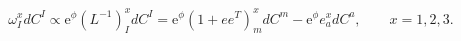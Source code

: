 \begin{equation}\omega_I^xdC^I\propto \mathrm{e}^\phi
(L^{-1})_I^xdC^I=\mathrm{e}^\phi(1+ee^T)_m^xdC^m-\mathrm{e}^\phi
e_a^xdC^a, \qquad x=1,2,3. \label{omega} \end{equation}

